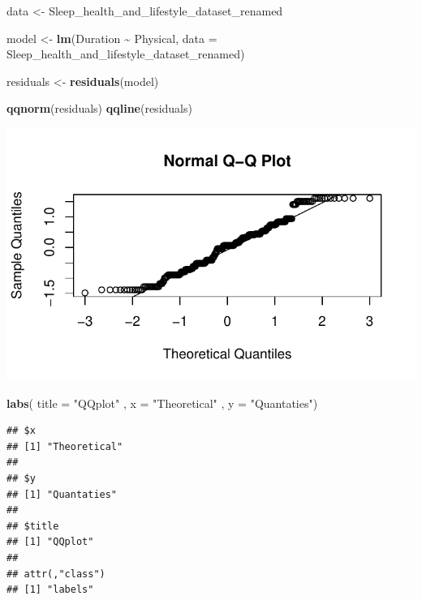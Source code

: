 \documentclass[
  11pt,
]{article}
\newenvironment{Shaded}{\begin{snugshade}}{\end{snugshade}}
\newcommand{\AttributeTok}[1]{\textcolor[rgb]{0.13,0.29,0.53}{#1}}
\newcommand{\FunctionTok}[1]{\textcolor[rgb]{0.13,0.29,0.53}{\textbf{#1}}}
\newcommand{\NormalTok}[1]{#1}
\newcommand{\OtherTok}[1]{\textcolor[rgb]{0.56,0.35,0.01}{#1}}
\newcommand{\SpecialCharTok}[1]{\textcolor[rgb]{0.81,0.36,0.00}{\textbf{#1}}}
\newcommand{\StringTok}[1]{\textcolor[rgb]{0.31,0.60,0.02}{#1}}
\begin{document}
\begin{Shaded}
\begin{Highlighting}[]
\NormalTok{data }\OtherTok{\textless{}{-}}\NormalTok{ Sleep\_health\_and\_lifestyle\_dataset\_renamed}

\NormalTok{model }\OtherTok{\textless{}{-}} \FunctionTok{lm}\NormalTok{(Duration }\SpecialCharTok{\textasciitilde{}}\NormalTok{ Physical, }\AttributeTok{data =}\NormalTok{ Sleep\_health\_and\_lifestyle\_dataset\_renamed)}
\end{Highlighting}
\end{Shaded}

\begin{Shaded}
\begin{Highlighting}[]
\NormalTok{residuals }\OtherTok{\textless{}{-}} \FunctionTok{residuals}\NormalTok{(model)}

\FunctionTok{qqnorm}\NormalTok{(residuals)}
\FunctionTok{qqline}\NormalTok{(residuals)}
\end{Highlighting}
\end{Shaded}

\begin{center}\includegraphics[width=0.7\linewidth]{SleepHelath_files/figure-latex/unnamed-chunk-25-1} \end{center}

\begin{Shaded}
\begin{Highlighting}[]
\FunctionTok{labs}\NormalTok{( }\AttributeTok{title  =} \StringTok{"QQplot"}\NormalTok{ , }\AttributeTok{x =} \StringTok{"Theoretical"}\NormalTok{ , }\AttributeTok{y =} \StringTok{"Quantaties"}\NormalTok{)}
\end{Highlighting}
\end{Shaded}

\begin{verbatim}
## $x
## [1] "Theoretical"
## 
## $y
## [1] "Quantaties"
## 
## $title
## [1] "QQplot"
## 
## attr(,"class")
## [1] "labels"
\end{verbatim}
\end{document}
